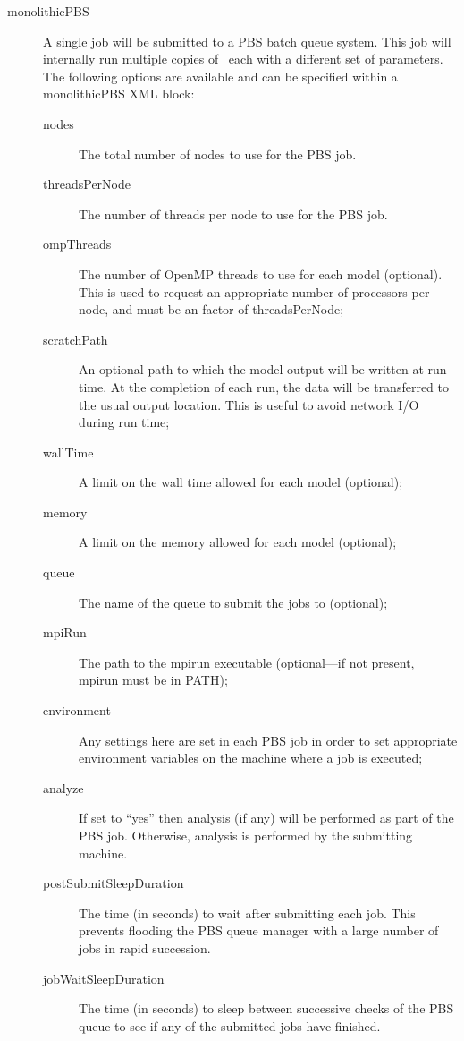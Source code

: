 \begin{description}
\item[{\normalfont \ttfamily monolithicPBS}] A single job will be submitted to a {\normalfont \ttfamily PBS} batch queue system. This job will internally run multiple copies of \glc\ each with a different set of parameters. The following options are available and can be specified within a {\normalfont \ttfamily monolithicPBS} XML block:
\begin{description}
\item[{\normalfont \ttfamily nodes}] The total number of nodes to use for the PBS job.
\item[{\normalfont \ttfamily threadsPerNode}] The number of threads per node to use for the PBS job.
\item[{\normalfont \ttfamily ompThreads}] The number of OpenMP threads to use for each model (optional). This is used to request an appropriate number of processors per node, and must be an factor of {\normalfont \ttfamily threadsPerNode};
\item[{\normalfont \ttfamily scratchPath}] An optional path to which the model output will be written at run time. At the completion of each run, the data will be transferred to the usual output location. This is useful to avoid network I/O during run time;
\item[{\normalfont \ttfamily wallTime}] A limit on the wall time allowed for each model (optional);
\item[{\normalfont \ttfamily memory}] A limit on the memory allowed for each model (optional);
\item[{\normalfont \ttfamily queue}] The name of the queue to submit the jobs to (optional);
\item[{\normalfont \ttfamily mpiRun}] The path to the {\normalfont \ttfamily mpirun} executable (optional---if not present, {\normalfont \ttfamily mpirun} must be in {\normalfont \ttfamily PATH});
\item[{\normalfont \ttfamily environment}] Any settings here are set in each {\normalfont \scshape PBS} job in order to set appropriate environment variables on the machine where a job is executed;
\item[{\normalfont \ttfamily analyze}] If set to ``{\normalfont \ttfamily yes}'' then analysis (if any) will be performed as part of the PBS job. Otherwise, analysis is performed by the submitting machine.
\item[{\normalfont \ttfamily postSubmitSleepDuration}] The time (in seconds) to wait after submitting each job. This prevents flooding the PBS queue manager with a large number of jobs in rapid succession.
\item[{\normalfont \ttfamily jobWaitSleepDuration}] The time (in seconds) to sleep between successive checks of the PBS queue to see if any of the submitted jobs have finished.
\end{description}


\end{description}
